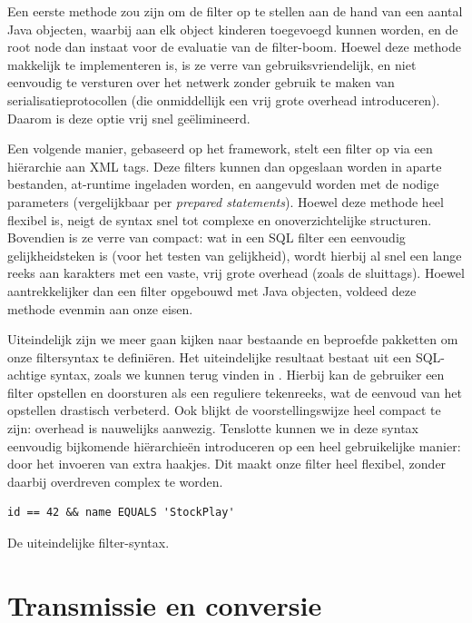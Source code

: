 Een eerste methode zou zijn om de filter op te stellen aan de hand van een aantal Java objecten, waarbij aan elk object kinderen toegevoegd kunnen worden, en de root node dan instaat voor de evaluatie van de filter-boom. Hoewel deze methode makkelijk te implementeren is, is ze verre van gebruiksvriendelijk, en niet eenvoudig te versturen over het netwerk zonder gebruik te maken van serialisatieprotocollen (die onmiddellijk een vrij grote overhead introduceren). Daarom is deze optie vrij snel ge\"elimineerd.

Een volgende manier, gebaseerd op het  framework, stelt een filter op via een hi\"erarchie aan XML tags. Deze filters kunnen dan opgeslaan worden in aparte bestanden, at-runtime ingeladen worden, en aangevuld worden met de nodige parameters (vergelijkbaar per \emph{prepared statements}). Hoewel deze methode heel flexibel is, neigt de syntax snel tot complexe en onoverzichtelijke structuren. Bovendien is ze verre van compact: wat in een SQL filter een eenvoudig gelijkheidsteken is (voor het testen van gelijkheid), wordt hierbij al snel een lange reeks aan karakters met een vaste, vrij grote overhead (zoals de sluittags). Hoewel aantrekkelijker dan een filter opgebouwd met Java objecten, voldeed deze methode evenmin aan onze eisen.

Uiteindelijk zijn we meer gaan kijken naar bestaande en beproefde pakketten om onze filtersyntax te defini\"eren. Het uiteindelijke resultaat bestaat uit een SQL-achtige syntax, zoals we kunnen terug vinden in . Hierbij kan de gebruiker een filter opstellen en doorsturen als een reguliere tekenreeks, wat de eenvoud van het opstellen drastisch verbeterd. Ook blijkt de voorstellingswijze heel compact te zijn: overhead is nauwelijks aanwezig. Tenslotte kunnen we in deze syntax eenvoudig bijkomende hi\"erarchie\"en introduceren op een heel gebruikelijke manier: door het invoeren van extra haakjes. Dit maakt onze filter heel flexibel, zonder daarbij overdreven complex te worden.

\begin{code}
\begin{verbatim}
id == 42 && name EQUALS 'StockPlay'
\end{verbatim}
\caption{De uiteindelijke filter-syntax.}
\end{code}


\section{Transmissie en conversie}

